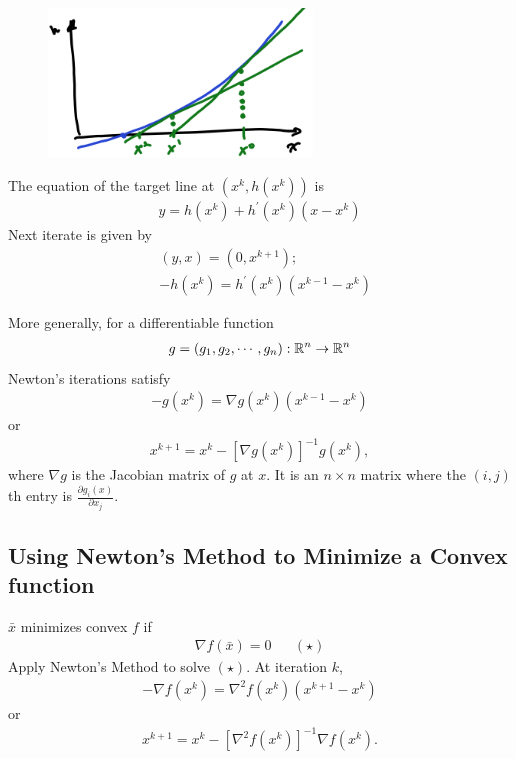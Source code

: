 \documentclass[11pt]{article}
\numberwithin{equation}{section}
\begin{document}
\begin{figure}
    \centering
    \includegraphics[width = 7cm]{images/13-ex-1.png}
    \caption{}
\end{figure}

The equation of the target line at $(x^k, h(x^k))$ is \begin{align*}
    y = h(x^k) + h^\prime(x^k)(x - x^k)
\end{align*}
Next iterate is given by \begin{align*}
    &(y,x) = (0,x^{k+1});\\
    &-h\left(x^{k}\right)=h^{\prime}\left(x^{k}\right)\left(x^{k-1}-x^{k}\right)
\end{align*}

More generally, for a differentiable function \begin{align*}
    g=(g_1, g_2, \cdots, g_n):\mathbb R^n \rightarrow \mathbb R^n
\end{align*}
Newton's iterations satisfy \begin{align*}
    -g\left(x^{k}\right)=\nabla g\left(x^{k}\right)\left(x^{k-1}-x^{k}\right)
\end{align*}
or \begin{align*}
    x^{k+1}=x^{k}-\left[\nabla g(x^{k})\right]^{-1} g(x^{k}),
\end{align*}
where $\nabla g$ is the Jacobian matrix of $g$ at $x$. It is an $n \times n$ matrix where the $(i,j)$th entry is $\frac{\partial g_i(x)}{\partial x_j}$.

\subsection{Using Newton's Method to Minimize a Convex function}
$\bar{x}$ minimizes convex $f$ if \begin{align*}
    \nabla f(\bar{x}) = 0 && (\star)
\end{align*}
Apply Newton's Method to solve $(\star)$. At iteration $k$,\begin{align*}
    -\nabla f\left(x^{k}\right)= \nabla^{2} f\left(x^{k}\right)\left(x^{k+1}-x^{k}\right)
\end{align*}
or \begin{align*}
    x^{k+1}=x^{k}-\left[\nabla^{2} f\left(x^{k}\right)\right]^{-1} \nabla f\left(x^{k}\right).
\end{align*}
\end{document}
